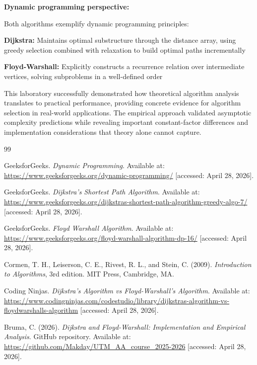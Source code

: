 \documentclass[12pt, a4paper]{report}
\begin{document}
\textbf{Dynamic programming perspective:}

Both algorithms exemplify dynamic programming principles:
\begin{dashenum}
  \item \textbf{Dijkstra:} Maintains optimal substructure through the distance array, using greedy selection combined with relaxation to build optimal paths incrementally
  \item \textbf{Floyd-Warshall:} Explicitly constructs a recurrence relation over intermediate vertices, solving subproblems in a well-defined order
\end{dashenum}

This laboratory successfully demonstrated how theoretical algorithm analysis translates to practical performance, providing concrete evidence for algorithm selection in real-world applications. The empirical approach validated asymptotic complexity predictions while revealing important constant-factor differences and implementation considerations that theory alone cannot capture.

\begin{thebibliography}{99}
\thispagestyle{plain}

  GeeksforGeeks. \textit{Dynamic Programming}.
  Available at: \url{https://www.geeksforgeeks.org/dynamic-programming/}
  [accessed: April 28, 2026].

  GeeksforGeeks. \textit{Dijkstra's Shortest Path Algorithm}.
  Available at: \url{https://www.geeksforgeeks.org/dijkstras-shortest-path-algorithm-greedy-algo-7/}
  [accessed: April 28, 2026].

  GeeksforGeeks. \textit{Floyd Warshall Algorithm}.
  Available at: \url{https://www.geeksforgeeks.org/floyd-warshall-algorithm-dp-16/}
  [accessed: April 28, 2026].

  Cormen, T. H., Leiserson, C. E., Rivest, R. L., and Stein, C. (2009).
  \textit{Introduction to Algorithms}, 3rd edition.
  MIT Press, Cambridge, MA.

  Coding Ninjas. \textit{Dijkstra's Algorithm vs Floyd-Warshall's Algorithm}.
  Available at: \url{https://www.codingninjas.com/codestudio/library/dijkstras-algorithm-vs-floydwarshalls-algorithm}
  [accessed: April 28, 2026].

  Bruma, C. (2026). \textit{Dijkstra and Floyd-Warshall: Implementation and Empirical Analysis}.
  GitHub repository. 
  Available at: \url{https://github.com/Makday/UTM_AA_course_2025-2026}
  [accessed: April 28, 2026].

\end{thebibliography}
\end{document}
